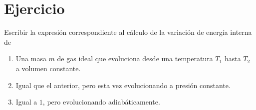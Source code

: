 \section{Ejercicio}\label{ej:Chap04Ejercicio04}
Escribir la expresión correspondiente al cálculo de la variación de energía interna de
\begin{enumerate}
    \item Una masa $m$ de gas ideal que evoluciona desde una temperatura $T_1$ hasta $T_2$ a volumen constante.
    \item Igual que el anterior, pero esta vez evolucionando a presión constante.
    \item Igual a $1$, pero evolucionando adiabáticamente.
\end{enumerate}